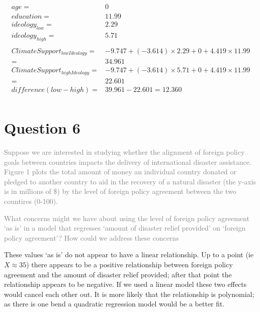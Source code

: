 \documentclass[12pt,letterpaper]{article}
\begin{document}
\begin{enumerate}[(a)]
  \begin{align*}
  age = & 0 \\
  education = & 11.99\\
  ideology_{low} = &  2.29\\
  ideology_{high} = & 5.71\\
  \\
  ClimateSupport_{low Ideology} = & -9.747 + (-3.614)\times 2.29 + 0 + 4.419\times 11.99\\
   = & 34.961\\
  ClimateSupport_{high Ideology} = & -9.747 + (-3.614)\times 5.71 + 0 + 4.419\times 11.99\\
  = & 22.601\\
  difference (low - high) = & 39.961 - 22.601 = 12.360\\
  \end{align*}
    
	 


\end{enumerate}

\newpage
\section*{Question 6}
\noindent \textcolor{gray}{Suppose we are interested in studying whether the alignment of foreign policy goals between countries impacts the delivery of international disaster assistance. Figure 1 plots the total amount of money an individual country donated or pledged to another country to aid in the recovery of a natural disaster (the y-axis is in millions of \$) by the level of foreign policy agreement between the two countires (0-100).}

\textcolor{gray}{What concerns might we have about using the level of foreign policy agreement `as is' in a
model that regresses `amount of disaster relief provided' on `foreign policy agreement'? How could we address these concerns}


  These values `as is' do not appear to have a linear relationship.  Up to a point (ie $X\approx 35$) there appears to be a positive relationship between foreign policy agreement and the amount of disaster relief provided; after that point the relationship appears to be negative.  If we used a linear model these two effects would cancel each other out.  It is more likely that the relationship is polynomial; as there is one bend a quadratic regression model would be a better fit.
  
\end{document}
